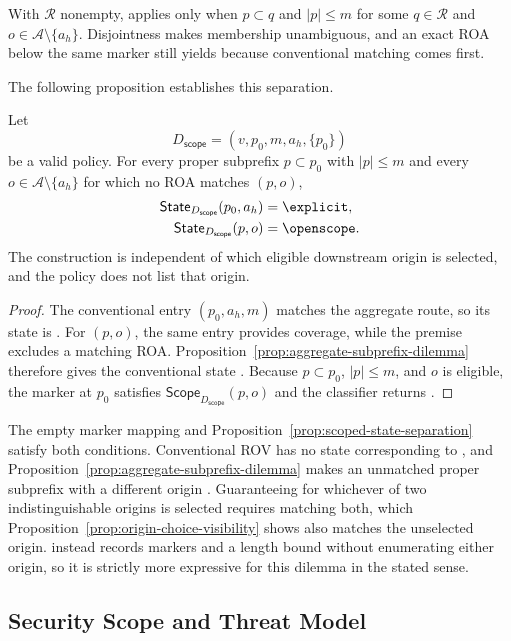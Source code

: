With $\mathcal{R}$ nonempty, \openscope{} applies only when $p\subset q$ and $|p|\leq m$ for some $q\in\mathcal{R}$ and $o\in\mathcal{A}\setminus\{a_h\}$. Disjointness makes membership unambiguous, and an exact ROA below the same marker still yields \explicit{} because conventional matching comes first.

The following proposition establishes this separation.

\begin{proposition}
\label{prop:scoped-state-separation}
Let
\[
D_{\mathsf{scope}}=(v,p_0,m,a_h,\{p_0\})
\]
be a valid policy. For every proper subprefix $p\subset p_0$ with $|p|\leq m$ and every $o\in\mathcal{A}\setminus\{a_h\}$ for which no ROA matches $(p,o)$,
\[
\begin{aligned}
\mathsf{State}_{D_{\mathsf{scope}}}(p_0,a_h)&=\explicit,\\
\mathsf{State}_{D_{\mathsf{scope}}}(p,o)&=\openscope.
\end{aligned}
\]
The construction is independent of which eligible downstream origin is selected, and the policy does not list that origin.
\end{proposition}

\begin{proof}
The conventional entry $(p_0,a_h,m)$ matches the aggregate route, so its state is \explicit{}. For $(p,o)$, the same entry provides coverage, while the premise excludes a matching ROA. Proposition~\ref{prop:aggregate-subprefix-dilemma} therefore gives the conventional state \invalid{}. Because $p\subset p_0$, $|p|\leq m$, and $o$ is eligible, the marker at $p_0$ satisfies $\mathsf{Scope}_{D_{\mathsf{scope}}}(p,o)$ and the classifier returns \openscope{}.
\end{proof}

The empty marker mapping and Proposition~\ref{prop:scoped-state-separation} satisfy both conditions. Conventional ROV has no state corresponding to \openscope{}, and Proposition~\ref{prop:aggregate-subprefix-dilemma} makes an unmatched proper subprefix with a different origin \invalid{}. Guaranteeing \valid{} for whichever of two indistinguishable origins is selected requires matching both, which Proposition~\ref{prop:origin-choice-visibility} shows also matches the unselected origin. \ssrov{} instead records markers and a length bound without enumerating either origin, so it is strictly more expressive for this dilemma in the stated sense.

\subsection{Security Scope and Threat Model}
\label{sec:security-scope}

